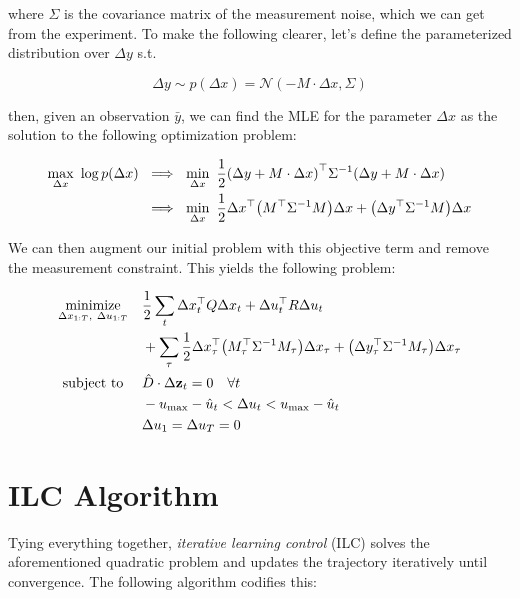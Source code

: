 \documentclass{article}
\begin{document}
where $\Sigma$ is the covariance matrix of the measurement noise, which we can get from the experiment.  To make the following clearer, let's define the parameterized distribution over $\Delta y$ s.t. 

$$
\Delta y \sim p(\Delta x) = \mathcal{N}(-M \cdot \Delta x, \Sigma)
$$

then, given an observation $\bar y$, we can find the MLE for the parameter $\Delta x$ as the solution to the following optimization problem:

\begin{align*}
\max_{\Delta x} \ \log p(\Delta x) \ &\implies \ \min_{\Delta x} \ \frac{1}{2} \qty(\Delta y + M \cdot \Delta x)^\top \Sigma^{-1} \qty(\Delta y + M \cdot \Delta x) \\
&\implies \ \min_{\Delta x} \ \frac{1}{2} \Delta x^\top \qty(M^\top \Sigma^{-1} M) \Delta x + \qty(\Delta y^\top \Sigma^{-1} M) \Delta x 
\end{align*}

We can then augment our initial problem with this objective term and remove the measurement constraint.  This yields the following problem:

\begin{align*}
  \underset{\Delta x_{1:T},\ \Delta u_{1:T}}{\text{minimize}} & \quad \frac{1}{2} \sum_t \Delta x^\top_t Q \Delta x_t + \Delta u^\top_t R \Delta u_t \\
  & \quad + \sum_\tau \frac{1}{2} \Delta x_\tau^\top \qty(M_\tau^\top \Sigma^{-1} M_\tau) \Delta x_\tau + \qty(\Delta y_\tau^\top \Sigma^{-1} M_\tau) \Delta x_\tau \\
  \text{subject to} \ 
  & \quad \hat D \cdot \Delta {\vb{z}}_t = 0 \quad \forall t \\
  & \quad -u_\text{max} - \hat u_t < \Delta u_t < u_\text{max} - \hat u_t \\
  & \quad \Delta u_1 = \Delta u_T = 0
\end{align*}

\newpage

\section*{ILC Algorithm}

Tying everything together, \textit{iterative learning control} (ILC) solves the aforementioned quadratic problem and updates the trajectory iteratively until convergence.  The following algorithm codifies this: 
\end{document}
